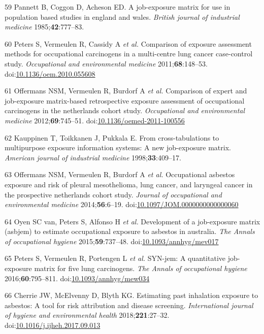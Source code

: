\documentclass[12pt,a4paper,]{report}
\begin{document}
\leavevmode\hypertarget{ref-Pannett1985}{}%
59 Pannett B, Coggon D, Acheson ED. A job-exposure matrix for use in
population based studies in england and wales. \emph{British journal of
industrial medicine} 1985;\textbf{42}:777--83.

\leavevmode\hypertarget{ref-Peters2011}{}%
60 Peters S, Vermeulen R, Cassidy A \emph{et al.} Comparison of exposure
assessment methods for occupational carcinogens in a multi-centre lung
cancer case-control study. \emph{Occupational and environmental
medicine} 2011;\textbf{68}:148--53.
doi:\href{https://doi.org/10.1136/oem.2010.055608}{10.1136/oem.2010.055608}

\leavevmode\hypertarget{ref-Offermans2012}{}%
61 Offermans NSM, Vermeulen R, Burdorf A \emph{et al.} Comparison of
expert and job-exposure matrix-based retrospective exposure assessment
of occupational carcinogens in the netherlands cohort study.
\emph{Occupational and environmental medicine} 2012;\textbf{69}:745--51.
doi:\href{https://doi.org/10.1136/oemed-2011-100556}{10.1136/oemed-2011-100556}

\leavevmode\hypertarget{ref-Kauppinen1998}{}%
62 Kauppinen T, Toikkanen J, Pukkala E. From cross-tabulations to
multipurpose exposure information systems: A new job-exposure matrix.
\emph{American journal of industrial medicine} 1998;\textbf{33}:409--17.

\leavevmode\hypertarget{ref-Offermans2014}{}%
63 Offermans NSM, Vermeulen R, Burdorf A \emph{et al.} Occupational
asbestos exposure and risk of pleural mesothelioma, lung cancer, and
laryngeal cancer in the prospective netherlands cohort study.
\emph{Journal of occupational and environmental medicine}
2014;\textbf{56}:6--19.
doi:\href{https://doi.org/10.1097/JOM.0000000000000060}{10.1097/JOM.0000000000000060}

\leavevmode\hypertarget{ref-Oyen2015}{}%
64 Oyen SC van, Peters S, Alfonso H \emph{et al.} Development of a
job-exposure matrix (asbjem) to estimate occupational exposure to
asbestos in australia. \emph{The Annals of occupational hygiene}
2015;\textbf{59}:737--48.
doi:\href{https://doi.org/10.1093/annhyg/mev017}{10.1093/annhyg/mev017}

\leavevmode\hypertarget{ref-Peters2016}{}%
65 Peters S, Vermeulen R, Portengen L \emph{et al.} SYN-jem: A
quantitative job-exposure matrix for five lung carcinogens. \emph{The
Annals of occupational hygiene} 2016;\textbf{60}:795--811.
doi:\href{https://doi.org/10.1093/annhyg/mew034}{10.1093/annhyg/mew034}

\leavevmode\hypertarget{ref-Cherrie2018}{}%
66 Cherrie JW, McElvenny D, Blyth KG. Estimating past inhalation
exposure to asbestos: A tool for risk attribution and disease screening.
\emph{International journal of hygiene and environmental health}
2018;\textbf{221}:27--32.
doi:\href{https://doi.org/10.1016/j.ijheh.2017.09.013}{10.1016/j.ijheh.2017.09.013}
\end{document}
